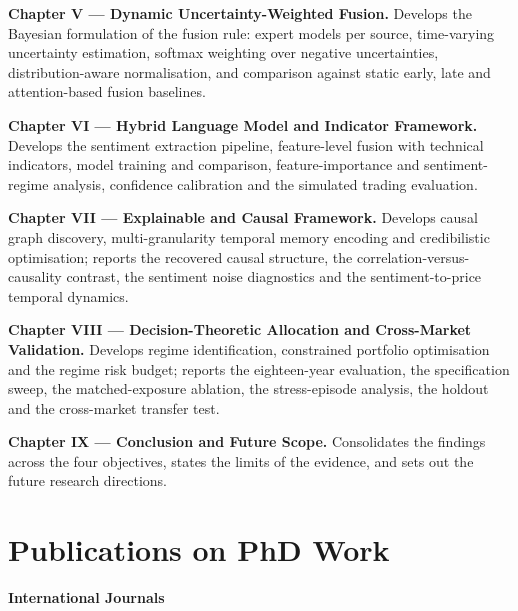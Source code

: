 \textbf{Chapter V --- Dynamic Uncertainty-Weighted Fusion.} Develops the Bayesian
formulation of the fusion rule: expert models per source, time-varying uncertainty
estimation, softmax weighting over negative uncertainties, distribution-aware
normalisation, and comparison against static early, late and attention-based fusion
baselines.

\textbf{Chapter VI --- Hybrid Language Model and Indicator Framework.} Develops the
sentiment extraction pipeline, feature-level fusion with technical indicators, model
training and comparison, feature-importance and sentiment-regime analysis, confidence
calibration and the simulated trading evaluation.

\textbf{Chapter VII --- Explainable and Causal Framework.} Develops causal graph discovery,
multi-granularity temporal memory encoding and credibilistic optimisation; reports the
recovered causal structure, the correlation-versus-causality contrast, the sentiment noise
diagnostics and the sentiment-to-price temporal dynamics.

\textbf{Chapter VIII --- Decision-Theoretic Allocation and Cross-Market Validation.}
Develops regime identification, constrained portfolio optimisation and the regime risk
budget; reports the eighteen-year evaluation, the specification sweep, the
matched-exposure ablation, the stress-episode analysis, the holdout and the cross-market
transfer test.

\textbf{Chapter IX --- Conclusion and Future Scope.} Consolidates the findings across the
four objectives, states the limits of the evidence, and sets out the future research
directions.

\chapter*{Publications on PhD Work}

\textbf{International Journals}

